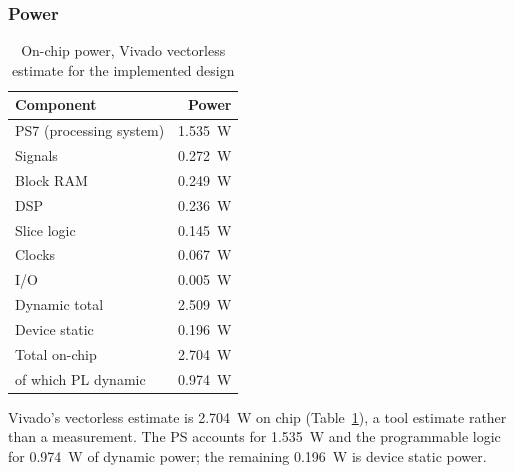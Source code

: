\documentclass[pdflatex,sn-mathphys-num,iicol]{sn-jnl}
\begin{document}
\subsubsection{Power}
\begin{table}[!htbp]
\centering
\caption{On-chip power, Vivado vectorless estimate for the implemented design}
\label{tab:power}
\begin{tabular*}{\columnwidth}{@{\extracolsep{\fill}}lr}
\toprule
Component & Power \\
\midrule
PS7 (processing system) & \SI{1.535}{\watt} \\
Signals                 & \SI{0.272}{\watt} \\
Block RAM               & \SI{0.249}{\watt} \\
DSP                     & \SI{0.236}{\watt} \\
Slice logic             & \SI{0.145}{\watt} \\
Clocks                  & \SI{0.067}{\watt} \\
I/O                     & \SI{0.005}{\watt} \\
\midrule
Dynamic total           & \SI{2.509}{\watt} \\
Device static           & \SI{0.196}{\watt} \\
\midrule
Total on-chip           & \SI{2.704}{\watt} \\
\quad of which PL dynamic  & \SI{0.974}{\watt} \\
\bottomrule
\end{tabular*}
\end{table}

Vivado's vectorless estimate is \SI{2.704}{\watt} on chip (Table~\ref{tab:power}),
a tool estimate rather than a measurement. The PS accounts for
\SI{1.535}{\watt} and the programmable logic for \SI{0.974}{\watt} of dynamic
power; the remaining \SI{0.196}{\watt} is device static power.
\end{document}
